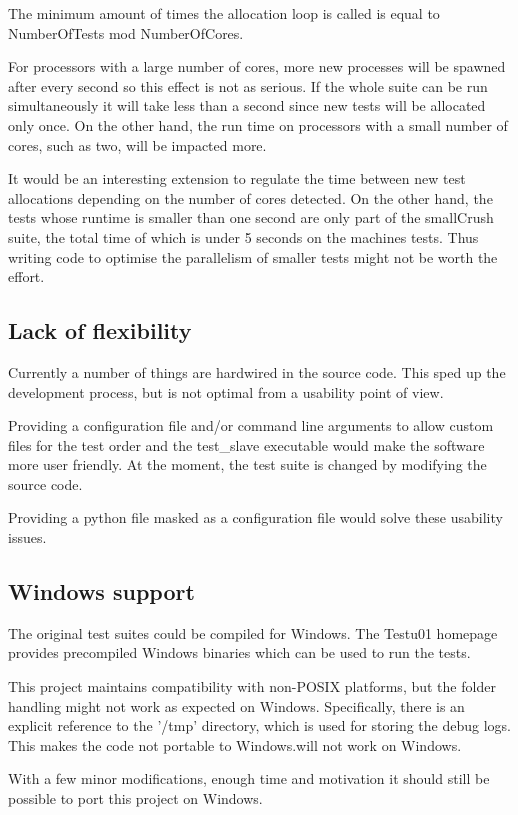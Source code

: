 The minimum amount of times the allocation loop is called is equal to NumberOfTests mod NumberOfCores.

For processors with a large number of cores, more new processes will be spawned after every second so this effect is not as serious. If the whole suite can be run simultaneously it will take less than a second since new tests will be allocated only once. On the other hand, the run time on processors with a small number of cores, such as two, will be impacted more.

It would be an interesting extension to regulate the time between new test allocations depending on the number of cores detected. On the other hand, the tests whose runtime is smaller than one second are only part of the smallCrush suite, the total time of which is under 5 seconds on the machines tests. Thus writing code to optimise the parallelism of smaller tests might not be worth the effort.

\subsection{Lack of flexibility}
Currently a number of things are hardwired in the source code. This sped up the development process, but is not optimal from a usability point of view.

Providing a configuration file and/or command line arguments to allow custom files for the test order and the test\_slave executable would make the software more user friendly. At the moment, the test suite is changed by modifying the source code.

Providing a python file masked as a configuration file would solve these usability issues.


\subsection{Windows support}
The original test suites could be compiled for Windows. The Testu01 homepage provides precompiled Windows binaries which can be used to run the tests.

This project maintains compatibility with non-POSIX platforms, but the folder handling might not work as expected on Windows. Specifically, there is an explicit reference to the '/tmp' directory, which is used for storing the debug logs. This makes the code not portable to Windows.will not work on Windows.

With a few minor modifications, enough time and motivation it should still be possible to port this project on Windows.

